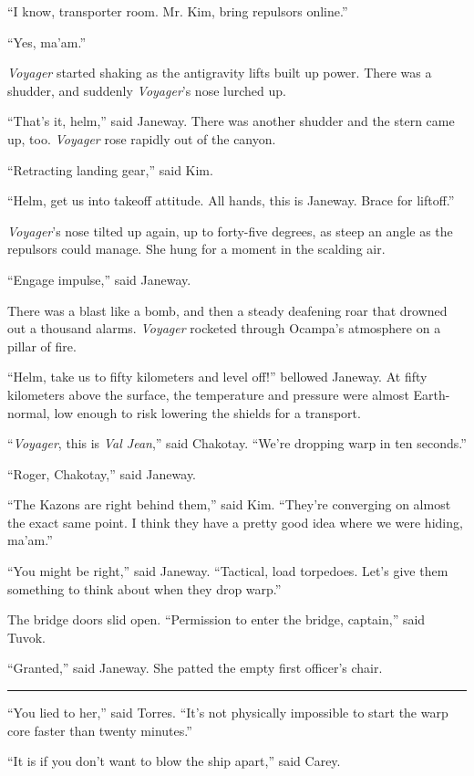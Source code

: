 \documentclass[twoside,letterpaper,12pt]{memoir}
\begin{document}
``I know, transporter room. Mr. Kim, bring repulsors online.''

``Yes, ma'am.''

\textit{Voyager} started shaking as the antigravity lifts built up power. There was a shudder, and suddenly \textit{Voyager}'s nose lurched up.

``That's it, helm,'' said Janeway. There was another shudder and the stern came up, too. \textit{Voyager} rose rapidly out of the canyon.

``Retracting landing gear,'' said Kim.

``Helm, get us into takeoff attitude. All hands, this is Janeway. Brace for liftoff.''

\textit{Voyager}'s nose tilted up again, up to forty-five degrees, as steep an angle as the repulsors could manage. She hung for a moment in the scalding air.

``Engage impulse,'' said Janeway.

There was a blast like a bomb, and then a steady deafening roar that drowned out a thousand alarms. \textit{Voyager} rocketed through Ocampa's atmosphere on a pillar of fire.

``Helm, take us to fifty kilometers and level off!'' bellowed Janeway. At fifty kilometers above the surface, the temperature and pressure were almost Earth-normal, low enough to risk lowering the shields for a transport.

``\textit{Voyager}, this is \textit{Val Jean},'' said Chakotay. ``We're dropping warp in ten seconds.''

``Roger, Chakotay,'' said Janeway.

``The Kazons are right behind them,'' said Kim. ``They're converging on almost the exact same point. I think they have a pretty good idea where we were hiding, ma'am.''

``You might be right,'' said Janeway. ``Tactical, load torpedoes. Let's give them something to think about when they drop warp.''

The bridge doors slid open. ``Permission to enter the bridge, captain,'' said Tuvok.

``Granted,'' said Janeway. She patted the empty first officer's chair.

\fancybreak{\rule{3cm}{0.4 pt}}
``You lied to her,'' said Torres. ``It’s not physically impossible to start the warp core faster than twenty minutes.''

``It is if you don’t want to blow the ship apart,'' said Carey.
\end{document}
